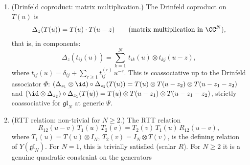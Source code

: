 \begin{theorem}
\begin{enumerate}[label=\textup{(\Roman*)}]
  $\Psi$\textup{)} is
  \begin{equation}\label{eq:glN-classical-r}
    r(z) = \frac{\Psi\, P}{z},
  \end{equation}
  with $r|_{\Psi = 0} = 0$. The unitarity relation is
  $R(u)\, R(-u) = (\Psi^2 - u^2)\, I$.
  The Yang--Baxter equation
  \begin{equation}\label{eq:glN-ybe}
    R_{12}(u-v)\, R_{13}(u)\, R_{23}(v)
    = R_{23}(v)\, R_{13}(u)\, R_{12}(u-v)
  \end{equation}
  holds for all $N$ and all $\Psi$
  \textup{(}computed numerically at $N = 2, 3$ by
  \texttt{glN\_affine\_yangian\_chiral\_qg\_engine.py};
  proved algebraically in
  Molev~\textup{\cite{Molev07}},
  Chapter~$1$\textup{)}.
  At $N = 1$: $P = 1$ and $R(u) = u + \Psi$ is scalar,
  recovering the class-$G$ case of
  Theorem~\textup{\ref{thm:w-infty-chiral-qg}}.
\item \textup{(Drinfeld coproduct: matrix multiplication.)}
  The Drinfeld coproduct on $T(u)$ is
  \begin{equation}\label{eq:glN-drinfeld-coprod}
    \Delta_z(T(u)) = T(u) \cdot T(u - z)
    \qquad
    \textup{(matrix multiplication in $\CC^N$)},
  \end{equation}
  that is, in components:
  \begin{equation}\label{eq:glN-coprod-components}
    \Delta_z(t_{ij}(u))
    = \sum_{k=1}^{N}\,
    t_{ik}(u) \otimes t_{kj}(u - z),
  \end{equation}
  where $t_{ij}(u) = \delta_{ij} + \sum_{r \geq 1}
  t_{ij}^{(r)}\, u^{-r}$.
  This is coassociative
  up to the Drinfeld associator $\Phi$:
  $(\Delta_{z_1} \otimes \id) \circ \Delta_{z_2}(T(u))
  = T(u) \otimes T(u - z_2) \otimes T(u - z_1 - z_2)$
  and
  $(\id \otimes \Delta_{z_2}) \circ \Delta_{z_1}(T(u))
  = T(u) \otimes T(u - z_1) \otimes T(u - z_1 - z_2)$,
  strictly coassociative for $\mathfrak{gl}_N$
  at generic $\Psi$.
\item \textup{(RTT relation: non-trivial for $N \geq 2$.)}
  The RTT relation
  \begin{equation}\label{eq:glN-rtt}
    R_{12}(u - v)\, T_1(u)\, T_2(v)
    = T_2(v)\, T_1(u)\, R_{12}(u - v),
  \end{equation}
  where $T_1(u) = T(u) \otimes I_N$,
  $T_2(v) = I_N \otimes T(v)$, is the defining relation of
  $Y(\mathfrak{gl}_N)$.
  For $N = 1$, this is trivially satisfied
  \textup{(}scalar $R$\textup{)}. For $N \geq 2$ it is a
  genuine quadratic constraint on the generators

\end{enumerate}
\end{theorem}
